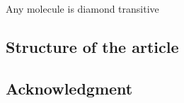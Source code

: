\begin{lem} \label{lem:diamond_transitive}
    Any molecule is diamond transitive
\end{lem}

\subsection*{Structure of the article}

\subsection*{Acknowledgment}

